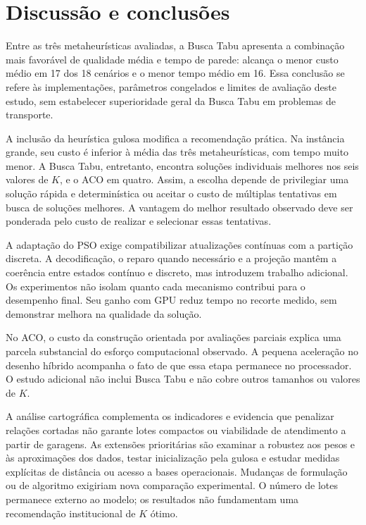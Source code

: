 \documentclass[12pt,a4paper]{article}
\begin{document}
\section{Discussão e conclusões}
\label{sec:conclusoes}

Entre as três metaheurísticas avaliadas, a Busca Tabu apresenta a combinação mais
favorável de qualidade média e tempo de parede: alcança o menor custo médio em 17 dos 18
cenários e o menor tempo médio em 16. Essa conclusão se refere às implementações,
parâmetros congelados e limites de avaliação deste estudo, sem estabelecer superioridade
geral da Busca Tabu em problemas de transporte.

A inclusão da heurística gulosa modifica a recomendação prática. Na instância grande,
seu custo é inferior à média das três metaheurísticas, com tempo muito menor. A Busca
Tabu, entretanto, encontra soluções individuais melhores nos seis valores de $K$, e o
ACO em quatro. Assim, a escolha depende de privilegiar uma solução rápida e
determinística ou aceitar o custo de múltiplas tentativas em busca de soluções melhores.
A vantagem do melhor resultado observado deve ser ponderada pelo custo de realizar e
selecionar essas tentativas.

A adaptação do PSO exige compatibilizar atualizações contínuas com a partição discreta.
A decodificação, o reparo quando necessário e a projeção mantêm a coerência entre
estados contínuo e discreto, mas introduzem trabalho adicional. Os experimentos não
isolam quanto cada mecanismo contribui para o desempenho final. Seu ganho com GPU reduz
tempo no recorte medido, sem demonstrar melhora na qualidade da solução.

No ACO, o custo da construção orientada por avaliações parciais explica uma parcela
substancial do esforço computacional observado. A pequena aceleração no desenho híbrido
acompanha o fato de que essa etapa permanece no processador. O estudo adicional não
inclui Busca Tabu e não cobre outros tamanhos ou valores de $K$.

A análise cartográfica complementa os indicadores e evidencia que penalizar relações
cortadas não garante lotes compactos ou viabilidade de atendimento a partir de garagens.
As extensões prioritárias são examinar a robustez aos pesos e às aproximações dos dados,
testar inicialização pela gulosa e estudar medidas explícitas de distância ou acesso a
bases operacionais. Mudanças de formulação ou de algoritmo exigiriam nova comparação
experimental. O número de lotes permanece externo ao modelo; os resultados não
fundamentam uma recomendação institucional de $K$ ótimo.
\end{document}
